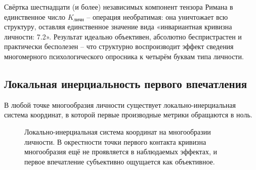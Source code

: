 \documentclass[11pt,a4paper]{article}
\begin{document}
Свёртка шестнадцати (и более) независимых компонент тензора Римана в единственное число $K_{\text{личн}}$ -- операция необратимая: она уничтожает всю структуру, оставляя единственное значение вида «инвариантная кривизна личности: 7.2». Результат идеально объективен, абсолютно беспристрастен и практически бесполезен -- что структурно воспроизводит эффект сведения многомерного психологического опросника к четырём буквам типа личности.

\subsection{Локальная инерциальность первого впечатления}

\begin{theorem}
В любой точке многообразия личности существует локально-инерциальная система координат, в которой первые производные метрики обращаются в ноль.
\end{theorem}

\begin{figure}[htbp]
\centering
{}
\caption{Локально-инерциальная система координат на многообразии личности. В окрестности точки первого контакта кривизна многообразия ещё не проявляется в наблюдаемых эффектах, и первое впечатление субъективно ощущается как объективное.}
\label{fig:inertial}
\end{figure}
\end{document}
